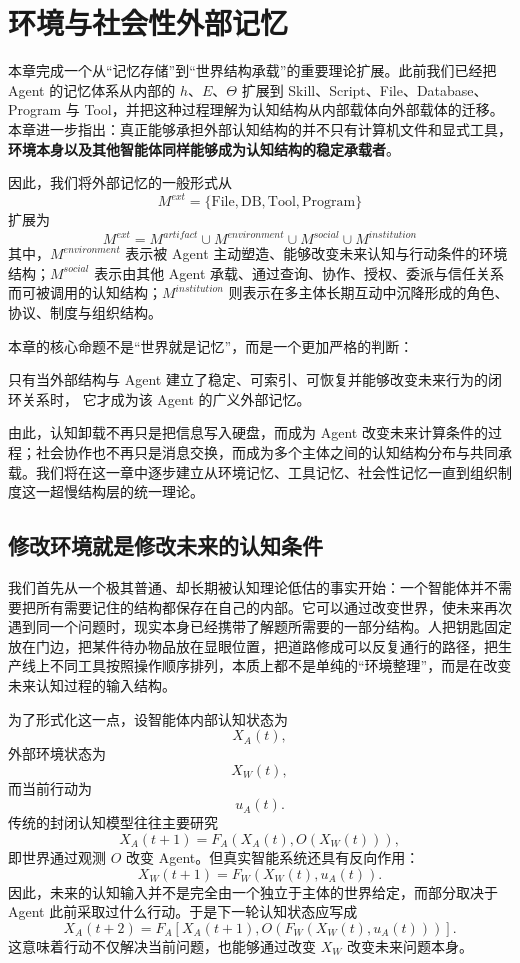 \chapter{环境与社会性外部记忆}
\label{chap:environment-social-external-memory}

\begin{chapterlead}
本章完成一个从``记忆存储''到``世界结构承载''的重要理论扩展。此前我们已经把 Agent 的记忆体系从内部的 $h$、$E$、$\Theta$ 扩展到 Skill、Script、File、Database、Program 与 Tool，并把这种过程理解为认知结构从内部载体向外部载体的迁移。本章进一步指出：真正能够承担外部认知结构的并不只有计算机文件和显式工具，\textbf{环境本身以及其他智能体同样能够成为认知结构的稳定承载者}。

因此，我们将外部记忆的一般形式从
\[
M^{ext}=\{\text{File},\text{DB},\text{Tool},\text{Program}\}
\]
扩展为
\[
\boxed{
M^{ext}
=
M^{artifact}
\cup
M^{environment}
\cup
M^{social}
\cup
M^{institution}
}
\]
其中，$M^{environment}$ 表示被 Agent 主动塑造、能够改变未来认知与行动条件的环境结构；$M^{social}$ 表示由其他 Agent 承载、通过查询、协作、授权、委派与信任关系而可被调用的认知结构；$M^{institution}$ 则表示在多主体长期互动中沉降形成的角色、协议、制度与组织结构。

本章的核心命题不是``世界就是记忆''，而是一个更加严格的判断：
\begin{statementbox}
只有当外部结构与 Agent 建立了稳定、可索引、可恢复并能够改变未来行为的闭环关系时，
它才成为该 Agent 的广义外部记忆。
\end{statementbox}
由此，认知卸载不再只是把信息写入硬盘，而成为 Agent 改变未来计算条件的过程；社会协作也不再只是消息交换，而成为多个主体之间的认知结构分布与共同承载。我们将在这一章中逐步建立从环境记忆、工具记忆、社会性记忆一直到组织制度这一超慢结构层的统一理论。
\end{chapterlead}

\section{修改环境就是修改未来的认知条件}

我们首先从一个极其普通、却长期被认知理论低估的事实开始：一个智能体并不需要把所有需要记住的结构都保存在自己的内部。它可以通过改变世界，使未来再次遇到同一个问题时，现实本身已经携带了解题所需要的一部分结构。人把钥匙固定放在门边，把某件待办物品放在显眼位置，把道路修成可以反复通行的路径，把生产线上不同工具按照操作顺序排列，本质上都不是单纯的``环境整理''，而是在改变未来认知过程的输入结构。

为了形式化这一点，设智能体内部认知状态为
\[
X_A(t),
\]
外部环境状态为
\[
X_W(t),
\]
而当前行动为
\[
u_A(t).
\]
传统的封闭认知模型往往主要研究
\[
X_A(t+1)
=
F_A\!\left(
X_A(t),O(X_W(t))
\right),
\]
即世界通过观测 $O$ 改变 Agent。但真实智能系统还具有反向作用：
\[
X_W(t+1)
=
F_W\!\left(
X_W(t),u_A(t)
\right).
\]
因此，未来的认知输入并不是完全由一个独立于主体的世界给定，而部分取决于 Agent 此前采取过什么行动。于是下一轮认知状态应写成
\[
X_A(t+2)
=
F_A\!\left[
X_A(t+1),
O\!\left(
F_W(X_W(t),u_A(t))
\right)
\right].
\]
这意味着行动不仅解决当前问题，也能够通过改变 $X_W$ 改变未来问题本身。

